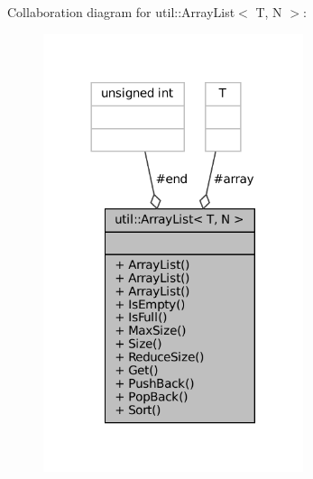 Collaboration diagram for util\+:\+:Array\+List$<$ T, N $>$\+:
\nopagebreak
\begin{figure}[H]
\begin{center}
\leavevmode
\includegraphics[width=216pt]{classutil_1_1ArrayList__coll__graph}
\end{center}
\end{figure}
